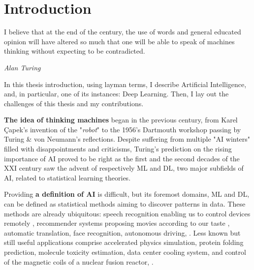 \chapter{Introduction}
\label{chapter:introduction}

{}





\epigraph{I believe that at the end of the century, the use of words and general educated opinion
      will have altered so much that one will be able to speak of machines thinking without expecting to
      be contradicted.}{\textit{Alan Turing}}

In this thesis introduction, using layman terms, I describe Artificial Intelligence, and,
in particular, one of its instances: Deep Learning. Then, I lay out the challenges of this
thesis and my contributions.


\textbf{The idea of thinking machines} began in the previous century, from Karel Çapek's invention of the
"\textit{robot}" to the 1956's Dartmouth workshop passing by Turing \& von Neumann's reflections.
Despite suffering from multiple "AI winters" filled with disappointments and criticisms, Turing's
prediction on the rising importance of \ac{AI} proved to be right as the first and the second
decades of the XXI century saw the advent of respectively \acf{ML} and \acf{DL}, two major subfields
of \ac{AI}, related to statistical learning theories.

Providing \textbf{a definition of \ac{AI}} is difficult, but its foremost domains, \ac{ML} and \ac{DL}, can be
defined as statistical methods aiming to discover patterns in data. These methods are already
ubiquitous: speech recognition enabling us to control devices remotely \citep{amodei2016deepspeech2}, recommender
systems proposing movies according to our taste \citep{toscher2009netflixprize}, automatic translation, face recognition,
autonomous driving, \etc. Less known but still useful applications comprise accelerated physics
simulation, protein folding prediction, molecule toxicity estimation, data center cooling system, and
control of the magnetic coils of a nuclear fusion reactor, \etc.

